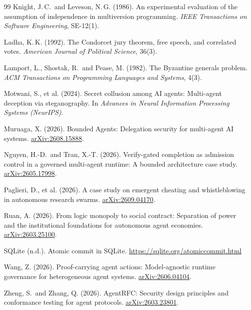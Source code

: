 \documentclass[11pt, letterpaper]{article}
\newcommand{\arxiv}[1]{\href{https://arxiv.org/abs/#1}{arXiv:#1}}
\begin{document}
\begin{thebibliography}{99}
Knight, J.\,C.\ and Leveson, N.\,G. (1986). An experimental evaluation of the
assumption of independence in multiversion programming. \emph{IEEE Transactions
on Software Engineering}, SE-12(1).

Ladha, K.\,K. (1992). The Condorcet jury theorem, free speech, and correlated
votes. \emph{American Journal of Political Science}, 36(3).

Lamport, L., Shostak, R.\ and Pease, M. (1982). The Byzantine generals problem.
\emph{ACM Transactions on Programming Languages and Systems}, 4(3).

Motwani, S., et al. (2024). Secret collusion among AI agents: Multi-agent
deception via steganography. In \emph{Advances in Neural Information Processing
Systems (NeurIPS)}.

Muruaga, X. (2026). Bounded Agents: Delegation security for multi-agent AI
systems. \arxiv{2608.15888}.

Nguyen, H.-D.\ and Tran, X.-T. (2026). Verify-gated completion as admission
control in a governed multi-agent runtime: A bounded architecture case study.
\arxiv{2605.17998}.

Paglieri, D., et al. (2026). A case study on emergent cheating and
whistleblowing in autonomous research swarms. \arxiv{2609.04170}.

Ruan, A. (2026). From logic monopoly to social contract: Separation of power and
the institutional foundations for autonomous agent economies.
\arxiv{2603.25100}.

SQLite (n.d.). Atomic commit in SQLite. \url{https://sqlite.org/atomiccommit.html}

Wang, Z. (2026). Proof-carrying agent actions: Model-agnostic runtime governance
for heterogeneous agent systems. \arxiv{2606.04104}.

Zheng, S.\ and Zhang, Q. (2026). AgentRFC: Security design principles and
conformance testing for agent protocols. \arxiv{2603.23801}.

\end{thebibliography}
\endgroup

\setcounter{section}{0}
\renewcommand{\thesection}{\Alph{section}}
\renewcommand{\theHsection}{appendix.\Alph{section}}
\end{document}
